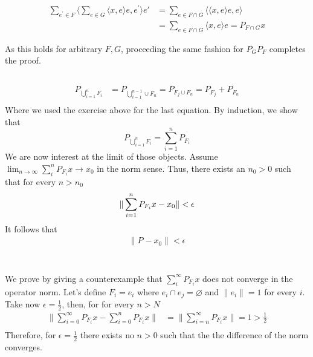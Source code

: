 \documentclass[a4paper,12pt]{article} %
\begin{document}
\begin{align*}
    \sum_{e^{\prime}  \in F} \langle \sum_{e \in  G}\langle x,e \rangle e   ,e^{\prime} \rangle e' & = \sum_{ e \in  F \cap G}\langle \langle x,e \rangle e,e  \rangle \\
                                                                                                   & = \sum_{e \in  F \cap G} \langle x,e \rangle  e = P_{F \cap G}x
\end{align*}

As this holds for arbitrary \(F, G\), proceeding the same fashion for \(P_G P_F\) completes the proof.

\subsection{}
\begin{align*}
    P_{\bigcup_{i=1}^{n} F_i } & = P_{\bigcup_{i=1}^{n-1}  \cup F_n} = P_{F_j \cup F_n} = P_{F_j}+P_{F_n} \\
\end{align*}
Where we used the exercise above for the last equation.
By induction, we show that
\begin{equation}
    P_{\bigcup_{i=1}^{n} F_i }  = \sum_{i=1} ^n P_{F_i}
\end{equation}
We are now interest at the limit of those objects. Assume \(\lim_{n \to \infty} \sum_{i} ^n P_{F_i}x \to  x_0\) in the norm sense. Thus, there exists an \(n_0>0\) such that for every \(n>n_0\)
\begin{equation}
    \| \sum_{i=1} ^n P_{F_i}x - x_0 \| < \epsilon \\
\end{equation}
It follows that
\begin{align*}
    \| P_{} - x_0 \| < \epsilon \\ \\
\end{align*}


\subsection{}
We prove by giving a counterexample that \(\sum_{i}^{\infty}  P_{F_i}x \) does not converge in the operator norm.
Let's define \(F_i= e_i\) where \(e_i \cap  e_j  = \varnothing \) and \(\| e_i \| = 1 \) for every \(i\).
Take now \(\epsilon =\frac{1}{2}\), then, for for every \(n>N\)
\begin{align*}
    \| \sum_{i=0}^{\infty} P_{F_i}x - \sum_{i=0}^n P_{F_i}x \| & = \| \sum_
    {i=n}^{\infty}  P_{F_i}x \| = 1 >\frac{1}{2}                            \\
\end{align*}
Therefore, for \(\epsilon =\frac{1}{2}\) there exists no \(n>0\) such that the the difference of the norm converges.
\end{document}
